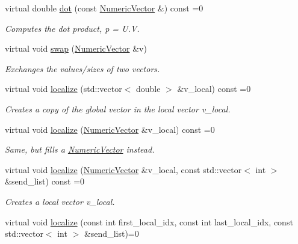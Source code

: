\begin{DoxyCompactItemize}
virtual double \mbox{\hyperlink{classfemus_1_1_numeric_vector_a11301832a7c65ec6f66aecdcf4adcebe}{dot}} (const \mbox{\hyperlink{classfemus_1_1_numeric_vector}{Numeric\+Vector}} \&) const =0
\begin{DoxyCompactList}\small\item\em Computes the dot product, p = U.\+V. \end{DoxyCompactList}\item 
virtual void \mbox{\hyperlink{classfemus_1_1_numeric_vector_af7c41b0e6db81bd7ad5e505753979dfd}{swap}} (\mbox{\hyperlink{classfemus_1_1_numeric_vector}{Numeric\+Vector}} \&v)
\begin{DoxyCompactList}\small\item\em Exchanges the values/sizes of two vectors. \end{DoxyCompactList}\item 
virtual void \mbox{\hyperlink{classfemus_1_1_numeric_vector_abd237a8a3e8ec60b2b6953db2c0bb3d7}{localize}} (std\+::vector$<$ double $>$ \&v\+\_\+local) const =0
\begin{DoxyCompactList}\small\item\em Creates a copy of the global vector in the local vector {\ttfamily v\+\_\+local}. \end{DoxyCompactList}\item 
virtual void \mbox{\hyperlink{classfemus_1_1_numeric_vector_abc5c852cbb755c8e0b3eb6c59d145ae0}{localize}} (\mbox{\hyperlink{classfemus_1_1_numeric_vector}{Numeric\+Vector}} \&v\+\_\+local) const =0
\begin{DoxyCompactList}\small\item\em Same, but fills a {\ttfamily \mbox{\hyperlink{classfemus_1_1_numeric_vector}{Numeric\+Vector}}} instead. \end{DoxyCompactList}\item 
virtual void \mbox{\hyperlink{classfemus_1_1_numeric_vector_a8fd7eaef548a167d7a25847545df90d3}{localize}} (\mbox{\hyperlink{classfemus_1_1_numeric_vector}{Numeric\+Vector}} \&v\+\_\+local, const std\+::vector$<$ int $>$ \&send\+\_\+list) const =0
\begin{DoxyCompactList}\small\item\em Creates a local vector {\ttfamily v\+\_\+local}. \end{DoxyCompactList}\item 
virtual void \mbox{\hyperlink{classfemus_1_1_numeric_vector_aab08801600890c48c64b0ddc08085928}{localize}} (const int first\+\_\+local\+\_\+idx, const int last\+\_\+local\+\_\+idx, const std\+::vector$<$ int $>$ \&send\+\_\+list)=0

\end{DoxyCompactItemize}
